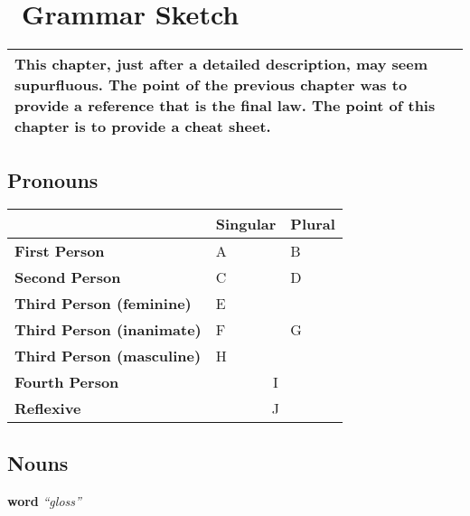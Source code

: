 
\chapter{\LanguageName\ Grammar Sketch}

\begin{center}
\begin{tabular}{|p{}|}
\hline
This chapter, just after a detailed description, may seem supurfluous.
The point of the previous chapter was to provide a reference that is the final law.
The point of this chapter is to provide a cheat sheet.
\\\hline
\end{tabular}
\end{center}

\section{Pronouns}

\begin{center}
\begin{tabular}{|l|l|l|}\hline
&\textbf{Singular}&\textbf{Plural}\\\hline
\textbf{First Person}&A&B\\\hline
\textbf{Second Person}&C&D\\\hline
\textbf{Third Person (feminine)}&E&\\\cline{1-2}
\textbf{Third Person (inanimate)}&F&G\\\cline{1-2}
\textbf{Third Person (masculine)}&H&\\\hline
\textbf{Fourth Person}&\multicolumn{2}{c|}{I}\\\hline
\textbf{Reflexive}&\multicolumn{2}{c|}{J}\\\hline
\end{tabular}
\end{center}

\section{Nouns}

\textbf{word} \textit{``gloss''}


